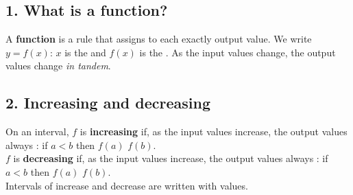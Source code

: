 

\subsection*{1. What is a function?}
A \textbf{function} is a rule that assigns to each  exactly  output value. We write $y=f(x)$: $x$ is the  and $f(x)$ is the . As the input values change, the output values change \emph{in tandem}.

\subsection*{2. Increasing and decreasing}
\begin{keyidea}
On an interval, $f$ is \textbf{increasing} if, as the input values increase, the output values always : if $a<b$ then $f(a)$ \fillin{$<$} $f(b)$.\\
$f$ is \textbf{decreasing} if, as the input values increase, the output values always : if $a<b$ then $f(a)$ \fillin{$>$} $f(b)$.\\
Intervals of increase and decrease are written with  values.
\end{keyidea}

